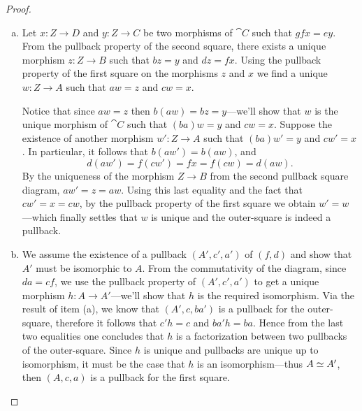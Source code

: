 \begin{proof}
    \begin{enumerate}[(a)]\setlength\itemsep{0em}
        \item Let \(x: Z \to D\) and \(y: Z \to C\) be two morphisms of \(\cat C\) such
              that \(g f x = e y\). From the pullback property of the second square, there
              exists a unique morphism \(z: Z \to B\) such that \(b z = y\) and
              \(d z = f x\). Using the pullback property of the first square on the
              morphisms \(z\) and \(x\) we find a unique \(w: Z \to A\) such that
              \(a w = z\) and \(c w = x\).

              Notice that since \(a w = z\) then \(b (a w) = b z = y\)---we'll show that
              \(w\) is the unique morphism of \(\cat C\) such that \((b a) w = y\) and
              \(c w = x\). Suppose the existence of another morphism \(w': Z \to A\) such
              that \((b a) w' = y\) and \(c w' = x\). In particular, it follows that \(b (a
              w') = b (a w)\), and
              \[
                  d (a w') = f (c w') = f x = f (c w) = d (a w).
              \]
              By the uniqueness of the morphism \(Z \to B\) from the second pullback square
              diagram, \(a w' = z = a w\). Using this last equality and the fact that
              \(c w' = x = c w\), by the pullback property of the first square we obtain
              \(w' = w\)---which finally settles that \(w\) is unique and the outer-square
              is indeed a pullback.

        \item We assume the existence of a pullback \((A', c', a')\) of \((f, d)\) and
              show that \(A'\) must be isomorphic to \(A\). From the commutativity of the
              diagram, since \(d a = c f\), we use the pullback property of \((A', c', a')\)
              to get a unique morphism \(h: A \to A'\)---we'll show that \(h\) is the
              required isomorphism. Via the result of item (a), we know that
              \((A', c, b a')\) is a pullback for the outer-square, therefore it follows
              that \(c' h = c\) and \(b a' h = b a\). Hence from the last two equalities one
              concludes that \(h\) is a factorization between two pullbacks of the
              outer-square. Since \(h\) is unique and pullbacks are unique up to
              isomorphism, it must be the case that \(h\) is an isomorphism---thus
              \(A \simeq A'\), then \((A, c, a)\) is a pullback for the first square.
    \end{enumerate}
\end{proof}

